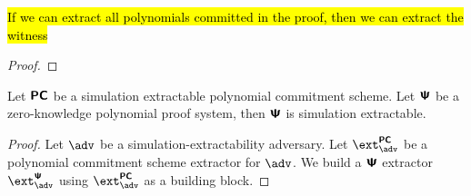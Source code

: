 \documentclass[runningheads,11pt]{llncs}
\begin{document}
\begin{lemma}
  \hl{If we can extract all polynomials committed in the proof, then we can
    extract the witness}
\end{lemma}
\begin{proof}
  
\end{proof}

\begin{corollary}
  Let $\bm{\mathsf{PC}}$ be a simulation extractable polynomial commitment scheme. Let
  $\bm{\mathsf{\Psi}}$ be a zero-knowledge polynomial proof system, then $\bm{\mathsf{\Psi}}$ is simulation extractable.
\end{corollary}
\begin{proof}
  Let $\adv$ be a simulation-extractability adversary. Let $\extpcom_\adv$ be a
  polynomial commitment scheme extractor for $\adv$. We build a $\bm{\mathsf{\Psi}}$ extractor
  $\extps_\adv$ using $\extpcom_\adv$ as a building block.
\end{proof}



\end{document}
